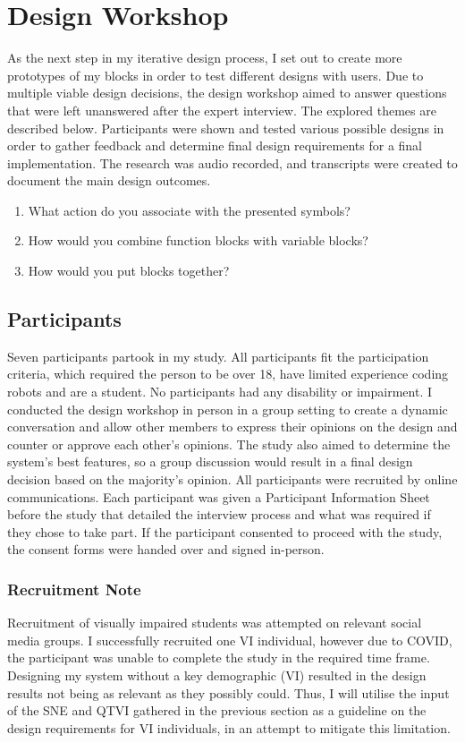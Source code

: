 \documentclass[oneside,%
                    author={Malak Hajji},
                    degree={BSc},
                    title={Designing An Accessible Computational Toolkit For Students},
                  subtitle={With Mixed Visual Abilities}]{dissertation}
\begin{document}
\section{Design Workshop}
As the next step in my iterative design process, I set out to create more prototypes of my blocks in order to test different designs with users. 
Due to multiple viable design decisions, the design workshop aimed to answer questions that were left unanswered after the expert interview. The explored themes are described below. 
Participants were shown and tested various possible designs in order to gather feedback and determine final design requirements for a final implementation. 
The research was audio recorded, and transcripts were created to document the main design outcomes.
\begin{enumerate}
    \item What action do you associate with the presented symbols?
    \item How would you combine function blocks with variable blocks?
    \item How would you put blocks together?
   
    
\end{enumerate}
\subsection{Participants}

Seven participants partook in my study. All participants fit the participation criteria, which required the person to be over 18, have limited experience coding robots and are a student. No participants had any disability or impairment. I conducted the design workshop in person in a group setting to create a dynamic conversation and allow other members to express their opinions on the design and counter or approve each other's opinions. The study also aimed to determine the system's best features, so a group discussion would result in a final design decision based on the majority's opinion.  
All participants were recruited by online communications. Each participant was given a Participant Information Sheet before the study that detailed the interview process and what was required if they chose to take part. If the participant consented to proceed with the study, the consent forms were handed over and signed in-person.

\subsubsection{Recruitment Note}
Recruitment of visually impaired students was attempted on relevant social media groups. I successfully recruited one VI individual, however due to COVID, the participant was unable to complete the study in the required time frame. Designing my system without a key demographic (VI) resulted in the design results not being as relevant as they possibly could. Thus, I will utilise the input of the SNE and QTVI gathered in the previous section as a guideline on the design requirements for VI individuals, in an attempt to mitigate this limitation.
\end{document}
